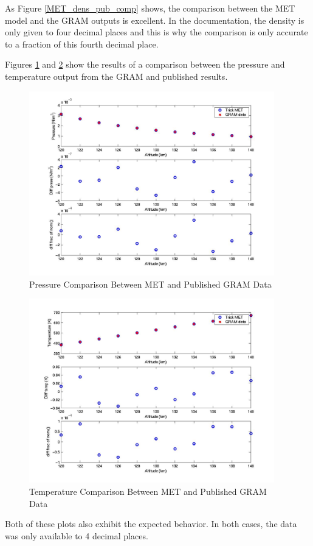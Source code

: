 \begin{description}
As Figure \ref{MET_dens_pub_comp} shows, the comparison between the MET model
and the GRAM outputs is excellent.  In the documentation, the density is
only given to four decimal places and this is why the comparison is only
accurate to a fraction of this fourth decimal place.

Figures \ref{MET_press_pub_comp} and \ref{MET_temp_pub_comp} show the results
of a comparison between the pressure and temperature output from the GRAM and
published results.

\begin{figure}[H]
\begin{center}
\includegraphics[height=80mm]{pics/MET_T01_pressure.jpg}
\caption{Pressure Comparison Between MET and Published GRAM Data}
\label{MET_press_pub_comp}
\end{center}
\end{figure}

\begin{figure}[H]
\begin{center}
\includegraphics[height=80mm]{pics/MET_T01_temperature.jpg}
\caption{Temperature Comparison Between MET and Published GRAM Data}
\label{MET_temp_pub_comp}
\end{center}
\end{figure}

Both of these plots also exhibit the expected behavior.  In both cases,
the data was only available to 4 decimal places.
\end{description}

